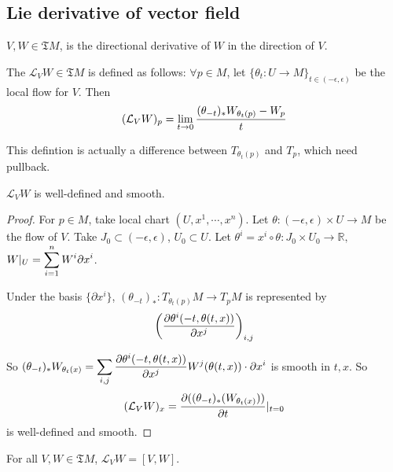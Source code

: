 \subsection{Lie derivative of vector field}
 $ V,W\in \mathfrak{T}M $,   is the directional derivative of  $ W $ in the direction of  $ V $.
 \begin{definition}
    The   $ \mathcal{L}_VW\in \mathfrak{T}M $ is defined as follows: $ \forall p\in M $, let  $ \{\theta_t:U\rightarrow M\}_{t\in (-\epsilon,\epsilon)} $ be the local flow for  $ V $. Then  \[\displaystyle (\mathcal{L}_VW)_p=\lim\limits_{t\to 0}\frac{(\theta_{-t})_*W_{\theta_t(p)}-W_p}{t} \]    
 \end{definition}
\begin{remark}
    This defintion is actually a difference between  $ T_{\theta_t(p)} $ and  $ T_p $, which need pullback.  
\end{remark}
 \begin{lemma}
     $ \mathcal{L}_VW $ is well-defined  and smooth.
 \end{lemma}    
\begin{proof}
    For  $ p\in M $, take local chart  $ (U,x^1,\cdots,x^n) $. Let  $ \theta :(-\epsilon,\epsilon)\times U\rightarrow M $ be the flow of  $ V $. Take  $ J_0\subset(-\epsilon,\epsilon) $,  $ U_0\subset U $. Let  $ \theta ^i=x^i\circ \theta:J_0\times U_0\rightarrow \mathbb{R} ,  $   $ \displaystyle W|_U=\sum\limits_{i=1}^nW^i\partial x^i $.    
    
    Under the basis  $ \{\partial x^i\} $,  $ (\theta_{-t})_*:T_{\theta_t(p)}M\rightarrow T_pM $ is represented by 
    \[ \left(\displaystyle\frac{\partial \theta^i(-t,\theta(t,x))}{\partial x^j}\right)_{i,j}\]
    
    So  $ \displaystyle(\theta_{-t})_*W_{\theta_t(x)}=\sum\limits_{i,j}\frac{\partial \theta^i(-t,\theta(t,x))}{\partial x^j}W^j(\theta(t,x))\cdot \partial x^i $ is smooth in  $ t,x $.
    So 
    \[(\mathcal{L}_VW)_x=\displaystyle\frac{\partial ((\theta_{-t})_*(W_{\theta_t(x)}))}{\partial t}|_{t=0}\] is well-defined and smooth.  
\end{proof}
 \begin{theorem}
    For all  $ V,W\in \mathfrak{T}M $,  $ \mathcal{L}_VW=[V,W] $.  
 \end{theorem}
